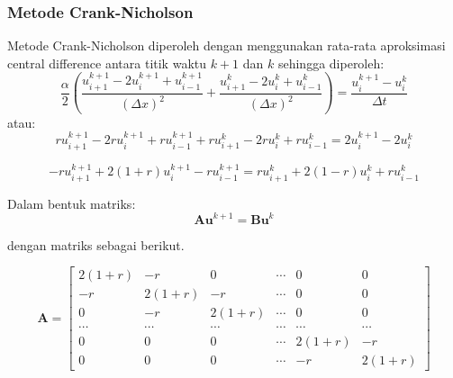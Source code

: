 \documentclass[9pt]{beamer}
\begin{document}
\begin{frame}
\frametitle{Metode Crank-Nicholson}

Metode Crank-Nicholson diperoleh dengan menggunakan rata-rata aproksimasi central difference
antara titik waktu $k + 1$ dan $k$ sehingga diperoleh:
\begin{equation}
\frac{\alpha}{2} \left(
\frac{u^{k+1}_{i+1} - 2u^{k+1}_{i} + u^{k+1}_{i-1}}{(\Delta x)^2} +
\frac{u^{k}_{i+1} - 2u^{k}_{i} + u^{k}_{i-1}}{(\Delta x)^2}
\right) =
\frac{u^{k+1}_{i} - u^{k}_{i}}{\Delta t}
\end{equation}
atau:
\begin{equation}
ru^{k+1}_{i+1} - 2ru^{k+1}_{i} + ru^{k+1}_{i-1} + ru^{k}_{i+1} - 2ru^{k}_{i} + ru^{k}_{i-1} = 2u^{k+1}_{i} - 2u^{k}_{i}
\end{equation}

\begin{equation}
-ru^{k+1}_{i+1} + 2(1 + r)u^{k+1}_{i} - ru^{k+1}_{i-1} = ru^{k}_{i+1} + 2(1 - r)u^{k}_{i} + ru^{k}_{i-1}
\end{equation}

Dalam bentuk matriks:
\begin{equation}
\mathbf{A}\mathbf{u}^{k+1} = \mathbf{B}\mathbf{u}^{k}
\end{equation}

dengan matriks sebagai berikut.

$$
\mathbf{A} =
\begin{bmatrix}
2(1 + r) & -r & 0 & \cdots & 0 & 0 \\
-r & 2(1 + r) & -r & \cdots & 0 & 0 \\
0 & -r & 2(1 + r) & \cdots & 0 & 0 \\
\cdots & \cdots & \cdots & \cdots & \cdots & \cdots \\
0 & 0 & 0 & \cdots & 2(1 + r) & -r \\
0 & 0 & 0 & \cdots & -r & 2(1 + r)
\end{bmatrix}
$$

\end{frame}
\end{document}
